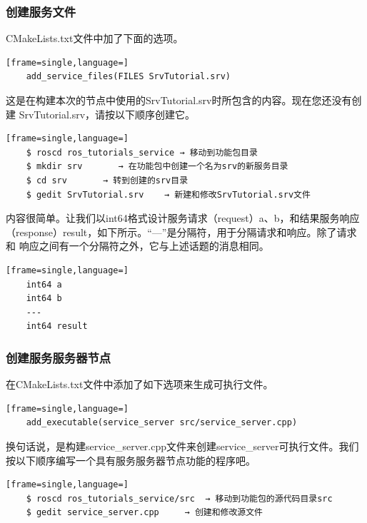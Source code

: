 \documentclass[geye,green,kindle,cn]{elegantnote}
\begin{document}
\subsubsection{创建服务文件}
CMakeLists.txt文件中加了下面的选项。
\begin{lstlisting}[frame=single,language=]
    add_service_files(FILES SrvTutorial.srv)
\end{lstlisting}

这是在构建本次的节点中使用的SrvTutorial.srv时所包含的内容。现在您还没有创建 SrvTutorial.srv，请按以下顺序创建它。 
\begin{lstlisting}[frame=single,language=]
    $ roscd ros_tutorials_service → 移动到功能包目录 
    $ mkdir srv       → 在功能包中创建一个名为srv的新服务目录 
    $ cd srv       → 转到创建的srv目录 
    $ gedit SrvTutorial.srv    → 新建和修改SrvTutorial.srv文件
\end{lstlisting}

内容很简单。让我们以int64格式设计服务请求（request）a、b，和结果服务响应 （response）result，如下所示。“---”是分隔符，用于分隔请求和响应。除了请求和 响应之间有一个分隔符之外，它与上述话题的消息相同。
\begin{lstlisting}[frame=single,language=]
    int64 a 
    int64 b 
    ---
    int64 result 
\end{lstlisting}
\subsubsection{创建服务服务器节点}
在CMakeLists.txt文件中添加了如下选项来生成可执行文件。
\begin{lstlisting}[frame=single,language=]
    add_executable(service_server src/service_server.cpp)
\end{lstlisting} 

换句话说，是构建service_server.cpp文件来创建service_server可执行文件。我们 按以下顺序编写一个具有服务服务器节点功能的程序吧。
\begin{lstlisting}[frame=single,language=]
    $ roscd ros_tutorials_service/src  → 移动到功能包的源代码目录src 
    $ gedit service_server.cpp     → 创建和修改源文件
\end{lstlisting}
\end{document}
